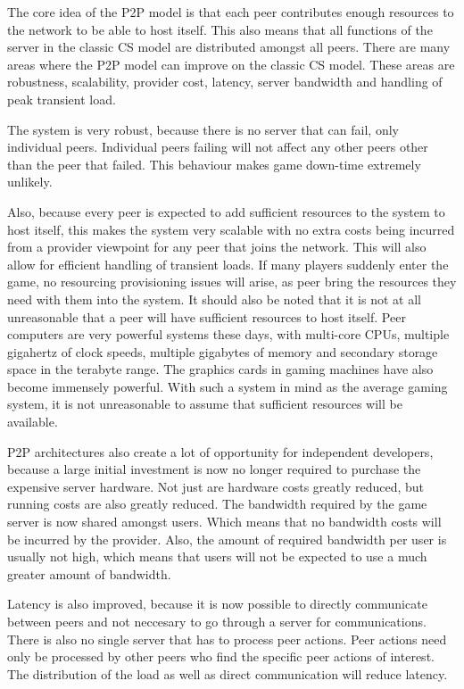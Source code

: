 \documentclass[journal,oneside,a4paper,onecolumn]{IEEEtran}
\begin{document}
The core idea of the \ac{P2P} model is that each peer contributes enough resources to the network to be able to host itself. This also means that all functions of the server in the classic \ac{CS} model are distributed amongst all peers. There are many areas where the \ac{P2P} model can improve on the classic \ac{CS} model. These areas are robustness, scalability, provider cost, latency, server bandwidth and handling of peak transient load.

The system is very robust, because there is no server that can fail, only individual peers. Individual peers failing will not affect any other peers other than the peer that failed. This behaviour makes game down-time extremely unlikely.

Also, because every peer is expected to add sufficient resources to the system to host itself, this makes the system very scalable with no extra costs being incurred from a provider viewpoint for any peer that joins the network. This will also allow for efficient handling of transient loads. If many players suddenly enter the game, no resourcing provisioning issues will arise, as peer bring the resources they need with them into the system. It should also be noted that it is not at all unreasonable that a peer will have sufficient resources to host itself. Peer computers are very powerful systems these days, with multi-core CPUs, multiple gigahertz of clock speeds, multiple gigabytes of memory and secondary storage space in the terabyte range. The graphics cards in gaming machines have also become immensely powerful. With such a system in mind as the average gaming system, it is not unreasonable to assume that sufficient resources will be available.

\ac{P2P} architectures also create a lot of opportunity for independent developers, because a large initial investment is now no longer required to purchase the expensive server hardware. Not just are hardware costs greatly reduced, but running costs are also greatly reduced. The bandwidth required by the game server is now shared amongst users. Which means that no bandwidth costs will be incurred by the provider. Also, the amount of required bandwidth per user is usually not high, which means that users will not be expected to use a much greater amount of bandwidth.

Latency is also improved, because it is now possible to directly communicate between peers and not neccesary to go through a server for communications. There is also no single server that has to process peer actions. Peer actions need only be processed by other peers who find the specific peer actions of interest. The distribution of the load as well as direct communication will reduce latency.
\end{document}
